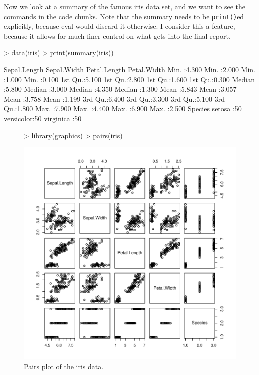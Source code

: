 \documentclass[a4paper]{article}
\begin{document}
Now we look at a summary of the famous iris data set, and we want to
see the commands in the code chunks.  Note that the summary needs to
be \texttt{print()}ed explicitly, because eval would discard it otherwise. I
consider this a feature, because it allows for much finer control on
what gets into the final report.



\begin{Schunk}
\begin{Sinput}
> data(iris)
> print(summary(iris))
\end{Sinput}
\begin{Soutput}
  Sepal.Length    Sepal.Width     Petal.Length    Petal.Width   
 Min.   :4.300   Min.   :2.000   Min.   :1.000   Min.   :0.100  
 1st Qu.:5.100   1st Qu.:2.800   1st Qu.:1.600   1st Qu.:0.300  
 Median :5.800   Median :3.000   Median :4.350   Median :1.300  
 Mean   :5.843   Mean   :3.057   Mean   :3.758   Mean   :1.199  
 3rd Qu.:6.400   3rd Qu.:3.300   3rd Qu.:5.100   3rd Qu.:1.800  
 Max.   :7.900   Max.   :4.400   Max.   :6.900   Max.   :2.500  
       Species  
 setosa    :50  
 versicolor:50  
 virginica :50  
\end{Soutput}
\end{Schunk}


\begin{figure}[htbp]
  \begin{center}
\begin{Schunk}
\begin{Sinput}
> library(graphics)
> pairs(iris)
\end{Sinput}
\end{Schunk}
\includegraphics{Sweave-test-1-006}
    \caption{Pairs plot of the iris data.}
  \end{center}
\end{figure}
\end{document}
